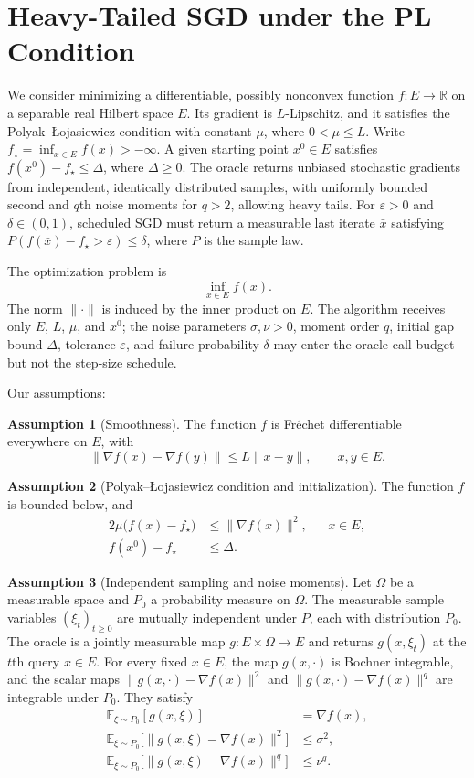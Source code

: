 \documentclass[10pt]{article}
\theoremstyle{definition}
\newtheorem{assumption}{Assumption}
\begin{document}
\section*{Heavy-Tailed SGD under the PL Condition}
We consider minimizing a differentiable, possibly nonconvex function $f:E\to\mathbb{R}$ on a separable real Hilbert space $E$. Its gradient is $L$-Lipschitz, and it satisfies the Polyak--\L{}ojasiewicz condition with constant $\mu$, where $0<\mu\leq L$. Write $f_\star=\inf_{x\in E}f(x)>-\infty$. A given starting point $x^0\in E$ satisfies $f(x^0)-f_\star\leq\Delta$, where $\Delta\geq0$. The oracle returns unbiased stochastic gradients from independent, identically distributed samples, with uniformly bounded second and $q$th noise moments for $q>2$, allowing heavy tails. For $\varepsilon>0$ and $\delta\in(0,1)$, scheduled SGD must return a measurable last iterate $\bar{x}$ satisfying $P(f(\bar{x})-f_\star>\varepsilon)\leq\delta$, where $P$ is the sample law.

The optimization problem is
\[
\inf_{x\in E} f(x).
\]
The norm $\|\cdot\|$ is induced by the inner product on $E$. The algorithm receives only $E$, $L$, $\mu$, and $x^0$; the noise parameters $\sigma,\nu>0$, moment order $q$, initial gap bound $\Delta$, tolerance $\varepsilon$, and failure probability $\delta$ may enter the oracle-call budget but not the step-size schedule.

Our assumptions:
\begin{assumption}[Smoothness]
The function $f$ is Fr\'echet differentiable everywhere on $E$, with
\[
\|\nabla f(x)-\nabla f(y)\|\leq L\|x-y\|,
\qquad x,y\in E.
\]
\end{assumption}

\begin{assumption}[Polyak--\L{}ojasiewicz condition and initialization]
The function $f$ is bounded below, and
\[
\begin{aligned}
2\mu\bigl(f(x)-f_\star\bigr)&\leq\|\nabla f(x)\|^2,
&&x\in E,\\
f(x^0)-f_\star&\leq\Delta.
\end{aligned}
\]
\end{assumption}

\begin{assumption}[Independent sampling and noise moments]
Let $\Omega$ be a measurable space and $P_0$ a probability measure on $\Omega$. The measurable sample variables $(\xi_t)_{t\geq0}$ are mutually independent under $P$, each with distribution $P_0$. The oracle is a jointly measurable map $g:E\times\Omega\to E$ and returns $g(x,\xi_t)$ at the $t$th query $x\in E$. For every fixed $x\in E$, the map $g(x,\cdot)$ is Bochner integrable, and the scalar maps $\|g(x,\cdot)-\nabla f(x)\|^2$ and $\|g(x,\cdot)-\nabla f(x)\|^q$ are integrable under $P_0$. They satisfy
\[
\begin{aligned}
\mathbb{E}_{\xi\sim P_0}[g(x,\xi)]&=\nabla f(x),\\
\mathbb{E}_{\xi\sim P_0}\bigl[\|g(x,\xi)-\nabla f(x)\|^2\bigr]&\leq\sigma^2,\\
\mathbb{E}_{\xi\sim P_0}\bigl[\|g(x,\xi)-\nabla f(x)\|^q\bigr]&\leq\nu^q.
\end{aligned}
\]
\end{assumption}
\end{document}
